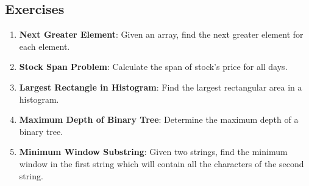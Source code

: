 \subsection*{Exercises}
\begin{enumerate}
    \item \textbf{Next Greater Element}: Given an array, find the next greater element for each element.
    
    \item \textbf{Stock Span Problem}: Calculate the span of stock's price for all days.
    
    \item \textbf{Largest Rectangle in Histogram}: Find the largest rectangular area in a histogram.
    
    \item \textbf{Maximum Depth of Binary Tree}: Determine the maximum depth of a binary tree.
    
    \item \textbf{Minimum Window Substring}: Given two strings, find the minimum window in the first string which will contain all the characters of the second string.
\end{enumerate}

